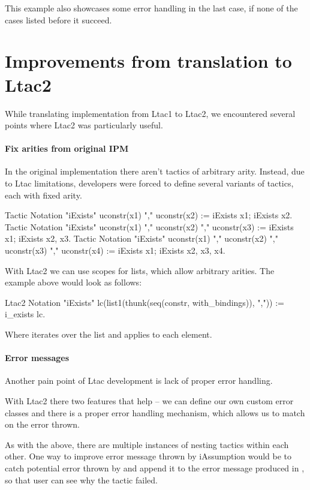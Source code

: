 This example also showcases some error handling in the last case, if none of the cases listed before it succeed.

\section{Improvements from translation to Ltac2}

While translating implementation from Ltac1 to Ltac2, we encountered several points where Ltac2 was particularly useful.

\paragraph{Fix arities from original IPM}

In the original implementation there aren't tactics of arbitrary arity.
Instead, due to Ltac limitations, developers were forced to define several variants of tactics, each with fixed arity.

\begin{coq}
Tactic Notation "iExists" uconstr(x1) "," uconstr(x2) :=
  iExists x1; iExists x2.
Tactic Notation "iExists" uconstr(x1) "," uconstr(x2) "," uconstr(x3) :=
  iExists x1; iExists x2, x3.
Tactic Notation "iExists" uconstr(x1) "," uconstr(x2) "," uconstr(x3) ","
    uconstr(x4) :=
  iExists x1; iExists x2, x3, x4.
\end{coq}

With Ltac2 we can use scopes for lists, which allow arbitrary arities.
The example above would look as follows:

\begin{coq}
  Ltac2 Notation "iExists" lc(list1(thunk(seq(constr, with_bindings)), ",")) :=
  i_exists lc.
\end{coq}

Where  iterates over the list and applies  to each element.

\paragraph{Error messages}

Another pain point of Ltac development is lack of proper error handling.

With Ltac2 there two features that help -- we can define our own custom error classes and there is a proper error handling mechanism, which allows us to match on the error thrown.

As with the  above, there are multiple instances of nesting tactics within each other.
One way to improve error message thrown by iAssumption would be to catch potential error thrown by  and append it to the error message produced in , so that user can see why the tactic failed.

